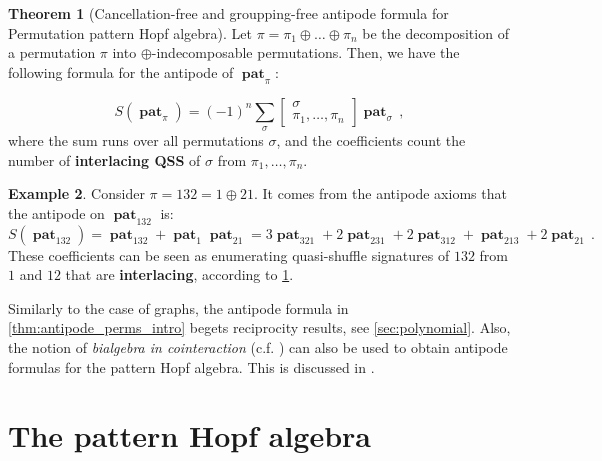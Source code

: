 \documentclass[submission]{FPSAC2023}
\theoremstyle{definition}
\newtheorem{thm}{Theorem}[section]
\newtheorem{smpl}[thm]{Example}
\DeclareMathOperator{\id}{id}
\DeclareMathOperator{\pat}{\mathbf{pat}}
\begin{document}
\begin{thm}[Cancellation-free and groupping-free antipode formula for Permutation pattern Hopf algebra]\label{thm:antipode_perms_intro}
Let $\pi = \pi_1\oplus \dots \oplus \pi_n$ be the decomposition of a permutation $\pi$ into $\oplus$-indecomposable permutations.
Then, we have the following formula for the antipode of $\pat_{\pi}$:

$$S(\pat_{\pi}) = (-1)^n \sum_{\sigma} \begin{bmatrix}
\sigma \\ \pi_1, \dots, \pi_n
\end{bmatrix} \pat_{\sigma}\, ,$$
where the sum runs over all permutations $\sigma$, and the coefficients count the number of \textbf{interlacing QSS} of $\sigma$ from $\pi_1, \dots, \pi_n$.
\end{thm}
\begin{smpl}
Consider $\pi = 132 = 1 \oplus 21$.
It comes from the antipode axioms that the antipode on $\pat_{132}$ is:
$$S(\pat_{132}) =\pat_{132} + \pat_1 \pat_{21} = 3 \pat_{321} + 2 \pat_{231} + 2 \pat_{312} + \pat_{213} + 2 \pat_{21}\, . $$
These coefficients can be seen as enumerating quasi-shuffle signatures of $132$ from $1$ and $12$ that are \textbf{interlacing}, according to \cref{thm:antipode_perms_intro}.
\end{smpl}
Similarly to the case of graphs, the antipode formula in \eqref{thm:antipode_perms_intro} begets reciprocity results, see \cref{sec:polynomial}. Also, the notion of \emph{bialgebra in cointeraction} (c.f. \cite{Foissy}) can also be used to obtain antipode formulas for the pattern Hopf algebra.
This is discussed in \cite{penaguiao2023polynomial}.

\section{The pattern Hopf algebra \label{sec:pattern_algebra_contruction}}
\end{document}
